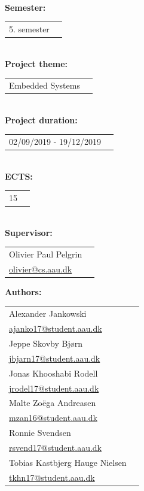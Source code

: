 \newpage
\makeatother
\begin{minipage}[T]{0.45\textwidth}
 \begin{flushleft}
  \textbf{\normalsize{}}\\ \maketitle
  \textbf{\normalsize{Semester:}}\\
  \begin{tabular}{ll}
  \normalsize{5. semester}
  \end{tabular}\\
  \textbf{\normalsize{Project theme:}}\\
  \begin{tabular}{ll}
    \normalsize{Embedded Systems}\\
  \end{tabular}\\
  \textbf{\normalsize{Project duration:}}\\
  \begin{tabular}{ll}
    \normalsize{02/09/2019 - 19/12/2019}
  \end{tabular}\\
  \textbf{\normalsize{ECTS:}}\\
  \begin{tabular}{ll}
  	\normalsize{15}
  \end{tabular}\\
  \textbf{\normalsize{Supervisor:}}\\
  \begin{tabular}{ll}
    \normalsize{Olivier Paul Pelgrin}\\
    \href{mailto:olivier@cs.aau.dk}{olivier@cs.aau.dk}\\
  \end{tabular}

  \textbf{\normalsize{Authors:}}\\
  \begin{tabular}{ll}
   \normalsize{Alexander Jankowski}\\
   \href{mailto:ajanko17@student.aau.dk}{ajanko17@student.aau.dk}\\
   \normalsize{Jeppe Skovby Bjørn}\\
   \href{mailto:jbjarn17@student.aau.dk}{jbjarn17@student.aau.dk}\\
   \normalsize{Jonas Khooshabi Rodell}\\
   \href{mailto:jrodel17@student.aau.dk}{jrodel17@student.aau.dk}\\
   \normalsize{Malte Zoëga Andreasen}\\
   \href{mailto:mzan16@student.aau.dk}{mzan16@student.aau.dk}\\
   \normalsize{Ronnie Svendsen}\\
   \href{mailto:rsvend17@student.aau.dk}{rsvend17@student.aau.dk}\\
   \normalsize{Tobias Kastbjerg Hauge Nielsen}\\
   \href{mailto:tkhn17@student.aau.dk}{tkhn17@student.aau.dk}\\
  \end{tabular}
 \end{flushleft}
\end{minipage}
